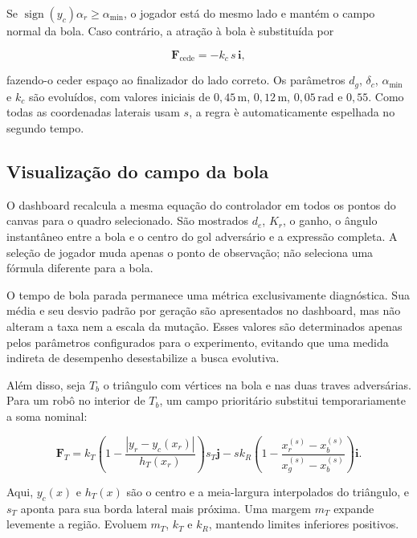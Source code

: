 \documentclass[12pt,a4paper]{article}
\newcommand{\vect}[1]{\boldsymbol{#1}}
\begin{document}
Se $\operatorname{sign}(y_c)\alpha_r\geq\alpha_{\min}$, o jogador est\'a do mesmo lado e mant\'em
o campo normal da bola. Caso contr\'ario, a atra\c{c}\~ao \`a bola \`e substitu\'ida por

\begin{equation}
 \vect{F}_{\mathrm{cede}}=-k_c\,s\,\vect{i},
\end{equation}

fazendo-o ceder espa\c{c}o ao finalizador do lado correto. Os par\^ametros
$d_g$, $\delta_c$, $\alpha_{\min}$ e $k_c$ s\~ao evolu\'idos, com valores iniciais
de $0{,}45\,\mathrm{m}$, $0{,}12\,\mathrm{m}$, $0{,}05\,\mathrm{rad}$ e $0{,}55$.
Como todas as coordenadas laterais usam $s$, a regra \`e automaticamente
espelhada no segundo tempo.

\subsection{Visualiza\c{c}\~ao do campo da bola}

O dashboard recalcula a mesma equa\c{c}\~ao do controlador em todos os pontos do
canvas para o quadro selecionado. S\~ao mostrados $d_e$, $K_r$, o ganho, o
\^angulo instant\^aneo entre a bola e o centro do gol advers\'ario e a express\~ao
completa. A sele\c{c}\~ao de jogador muda apenas o ponto de observa\c{c}\~ao; n\~ao
seleciona uma f\'ormula diferente para a bola.

O tempo de bola parada permanece uma m\'etrica exclusivamente diagn\'ostica. Sua
m\'edia e seu desvio padr\~ao por gera\c{c}\~ao s\~ao apresentados no dashboard,
mas n\~ao alteram a taxa nem a escala da muta\c{c}\~ao. Esses valores s\~ao
determinados apenas pelos par\^ametros configurados para o experimento, evitando
que uma medida indireta de desempenho desestabilize a busca evolutiva.

Al\'em disso, seja $T_b$ o tri\^angulo com v\'ertices na bola
e nas duas traves advers\'arias. Para um rob\^o no interior de $T_b$, um campo
priorit\'ario substitui temporariamente a soma nominal:

\begin{equation}
 \vect{F}_{T}=k_T\left(1-\frac{|y_r-y_c(x_r)|}{h_T(x_r)}\right)
 s_T\vect{j}-s k_R\left(1-\frac{x_r^{(s)}-x_b^{(s)}}{x_g^{(s)}-x_b^{(s)}}\right)\vect{i}.
\end{equation}

Aqui, $y_c(x)$ e $h_T(x)$ s\~ao o centro e a meia-largura interpolados do
tri\^angulo, e $s_T$ aponta para sua borda lateral mais pr\'oxima. Uma margem
$m_T$ expande levemente a regi\~ao. Evoluem $m_T$, $k_T$ e $k_R$, mantendo
limites inferiores positivos.
\end{document}
